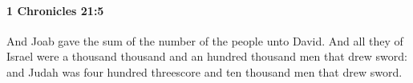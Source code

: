 
		\paragraph{1 Chronicles 21:5} %
			\label{1CHRONICLES-21-5}

			And Joab gave the sum of the number of the people unto David. And all they of Israel were a thousand thousand and an hundred thousand men that drew sword: and Judah was four hundred threescore and ten thousand men that drew sword.


